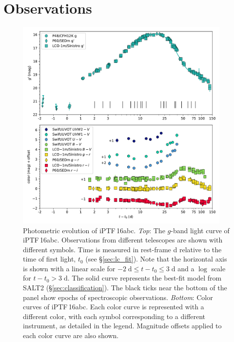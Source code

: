 \documentclass[twocolumn]{aastex61}
\newcommand{\abc}{iPTF\,16abc}
\begin{document}

\section{Observations}
\label{sec:obs}

\begin{figure}[htb]
  \centering
  \includegraphics[width=0.95\textwidth]{logLC_with_colors.pdf}
  \caption{Photometric evolution of \abc. \textit{Top}: The $g$-band
  light curve of \abc. Observations from different 
  telescopes are shown with different symbols. Time is measured in 
  rest-frame d relative to the time of first light, $t_0$ (see 
  \S\ref{sec:lc_fit}). Note that the horizontal axis is shown with a linear scale 
  for $-2 \; \mathrm{d} \le t - t_0 \le 3 \; \mathrm{d}$ and a 
  $\log$ scale for $t - t_0 > 3 \; \mathrm{d}$. The solid curve 
  represents the best-fit model from SALT2 
  (\S\ref{sec:classification}). The black ticks near the
  bottom of the panel show epochs of spectroscopic observations.
  \textit{Bottom}: Color curves of \abc. Each color curve is 
  represented with a different color, with each symbol corresponding 
  to a different instrument, as detailed in the legend. Magnitude 
  offsets applied to each color curve are also shown.
  }
  \label{fig:lightcurve}
\end{figure}
\end{document}
